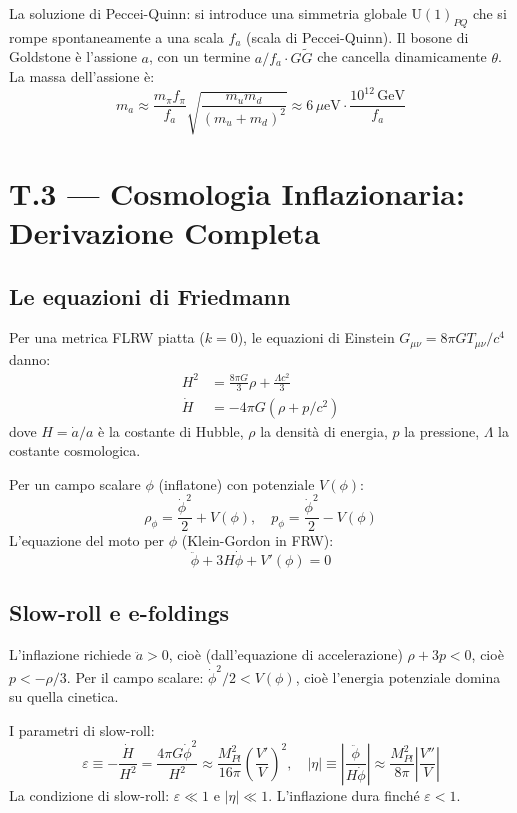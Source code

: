 \documentclass[11.5pt,a4paper,openany]{book}
\theoremstyle{remark}
\begin{document}
La soluzione di Peccei-Quinn: si introduce una simmetria globale $\mathrm{U}(1)_{PQ}$ che si rompe spontaneamente a una scala $f_a$ (scala di Peccei-Quinn). Il bosone di Goldstone è l'assione $a$, con un termine $a/f_a \cdot G\tilde{G}$ che cancella dinamicamente $\theta$. La massa dell'assione è:
\[
m_a \approx \frac{m_\pi f_\pi}{f_a}\sqrt{\frac{m_u m_d}{(m_u+m_d)^2}} \approx 6\,\mu\mathrm{eV} \cdot \frac{10^{12}\,\mathrm{GeV}}{f_a}
\]

\chapter*{T.3 — Cosmologia Inflazionaria: Derivazione Completa}

\section{Le equazioni di Friedmann}

Per una metrica FLRW piatta ($k=0$), le equazioni di Einstein $G_{\mu\nu} = 8\pi G T_{\mu\nu}/c^4$ danno:
\begin{align}
H^2 &= \frac{8\pi G}{3}\rho + \frac{\Lambda c^2}{3} \label{eq:F1}\\
\dot{H} &= -4\pi G(\rho + p/c^2) \label{eq:F2}
\end{align}
dove $H = \dot{a}/a$ è la costante di Hubble, $\rho$ la densità di energia, $p$ la pressione, $\Lambda$ la costante cosmologica.

Per un campo scalare $\phi$ (inflatone) con potenziale $V(\phi)$:
\[
\rho_\phi = \frac{\dot\phi^2}{2} + V(\phi), \quad p_\phi = \frac{\dot\phi^2}{2} - V(\phi)
\]
L'equazione del moto per $\phi$ (Klein-Gordon in FRW):
\[
\ddot\phi + 3H\dot\phi + V'(\phi) = 0
\]

\section{Slow-roll e e-foldings}

L'inflazione richiede $\ddot{a} > 0$, cioè (dall'equazione di accelerazione) $\rho + 3p < 0$, cioè $p < -\rho/3$. Per il campo scalare: $\dot\phi^2/2 < V(\phi)$, cioè l'energia potenziale domina su quella cinetica.

I parametri di slow-roll:
\[
\varepsilon \equiv -\frac{\dot H}{H^2} = \frac{4\pi G \dot\phi^2}{H^2} \approx \frac{M_{Pl}^2}{16\pi}\left(\frac{V'}{V}\right)^2, \quad
|\eta| \equiv \left|\frac{\ddot\phi}{H\dot\phi}\right| \approx \frac{M_{Pl}^2}{8\pi}\left|\frac{V''}{V}\right|
\]
La condizione di slow-roll: $\varepsilon \ll 1$ e $|\eta| \ll 1$. L'inflazione dura finché $\varepsilon < 1$.
\end{document}
